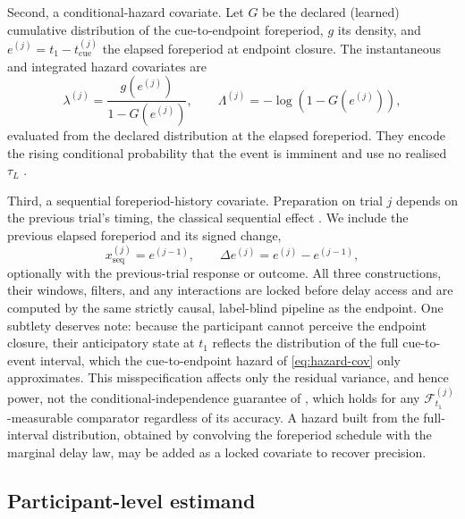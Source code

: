\documentclass[11pt,a4paper]{article}
\theoremstyle{definition}
\newcommand{\F}{\mathcal{F}}
\newcommand{\tauL}{\tau_L}
\begin{document}
Second, a conditional-hazard covariate. Let \(G\) be the declared (learned)
cumulative distribution of the cue-to-endpoint foreperiod, \(g\) its density, and
\(e^{(j)}=t_1-t_{\mathrm{cue}}^{(j)}\) the elapsed foreperiod at endpoint closure.
The instantaneous and integrated hazard covariates are
\begin{equation}
\label{eq:hazard-cov}
\lambda^{(j)}=\frac{g\!\left(e^{(j)}\right)}{1-G\!\left(e^{(j)}\right)},
\qquad
\Lambda^{(j)}=-\log\!\left(1-G\!\left(e^{(j)}\right)\right),
\end{equation}
evaluated from the declared distribution at the elapsed foreperiod. They encode
the rising conditional probability that the event is imminent and use no realised
\(\tauL\) \citep{Niemi1981,Nobre2010,Coull2009}.

Third, a sequential foreperiod-history covariate. Preparation on trial \(j\)
depends on the previous trial's timing, the classical sequential effect
\citep{Steinborn2008}. We include the previous elapsed foreperiod and its signed
change,
\begin{equation}
\label{eq:seq-cov}
x_{\mathrm{seq}}^{(j)}=e^{(j-1)},
\qquad
\Delta e^{(j)}=e^{(j)}-e^{(j-1)},
\end{equation}
optionally with the previous-trial response or outcome. All three constructions,
their windows, filters, and any interactions are locked before delay access and
are computed by the same strictly causal, label-blind pipeline as the endpoint.
One subtlety deserves note: because the participant cannot perceive the endpoint
closure, their anticipatory state at \(t_1\) reflects the distribution of the full
cue-to-event interval, which the cue-to-endpoint hazard of \eqref{eq:hazard-cov}
only approximates. This misspecification affects only the residual variance, and
hence power, not the conditional-independence guarantee of ,
which holds for any \(\F_{t_1}^{(j)}\)-measurable comparator regardless of its
accuracy. A hazard built from the full-interval distribution, obtained by
convolving the foreperiod schedule with the marginal delay law, may be added as a
locked covariate to recover precision.

\subsection{Participant-level estimand}
\label{sec:estimand}
\end{document}
